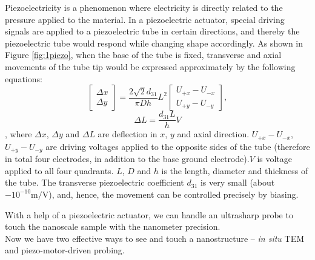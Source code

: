 Piezoelectricity is a phenomenon where electricity is directly related to the pressure applied to the material. In a piezoelectric actuator, special driving signals are applied to a piezoelectric tube in certain directions, and thereby the piezoelectric tube would respond while changing shape accordingly.\cite{okada2004piezoelectric,vishnevsky1977piezoelectric} As shown in Figure \ref{fig:1piezo}, when the base of the tube is fixed, transverse and axial movements of the tube tip would be expressed approximately by the following equations:
$$\begin{bmatrix}\Delta x\\ \Delta y\end{bmatrix}= \frac{2\sqrt{2}d_{31}}{\pi Dh}L^2\begin{bmatrix}U_{+x}-U_{-x}\\U_{+y}-U_{-y} \end{bmatrix},$$
$$\Delta L= \frac{d_{31}L}{h}V$$
, where $\Delta x$, $\Delta y$ and $\Delta L$ are deflection in $x$, $y$ and axial direction. $U_{+x}-U_{-x}$, $U_{+y}-U_{-y}$ are driving voltages applied to the opposite sides of the tube (therefore in total four electrodes, in addition to the base ground electrode).$V$ is voltage applied to all four quadrants. $L$, $D$ and $h$ is the length, diameter and thickness of the tube. The transverse piezoelectric coefficient $d_{31}$  is very small (about $-10^{-10} \mathrm{m/V}$), and, hence, the movement can be controlled precisely by biasing. 

With a help of a piezoelectric actuator, we can handle an ultrasharp probe to touch the nanoscale sample with the nanometer precision. 
\\
Now we have two effective ways to see and touch a nanostructure -- {\em in situ} TEM and piezo-motor-driven probing. 


